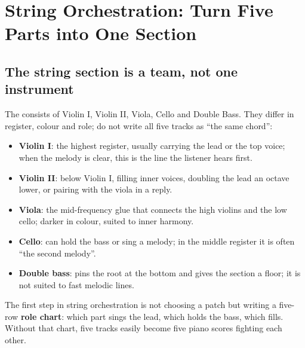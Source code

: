 \chapter{String Orchestration: Turn Five Parts into One Section}
\label{ch:strings}


\section{The string section is a team, not one instrument}
\label{sec:string-section}

The  consists of Violin I, Violin II, Viola, Cello and Double Bass. They differ in register, colour and role; do not write all five tracks as ``the same chord'':

\begin{itemize}
\item \textbf{Violin I}: the highest register, usually carrying the lead or the top voice; when the melody is clear, this is the line the listener hears first.
\item \textbf{Violin II}: below Violin I, filling inner voices, doubling the lead an octave lower, or pairing with the viola in a reply.
\item \textbf{Viola}: the mid-frequency glue that connects the high violins and the low cello; darker in colour, suited to inner harmony.
\item \textbf{Cello}: can hold the bass or sing a melody; in the middle register it is often ``the second melody''.
\item \textbf{Double bass}: pins the root at the bottom and gives the section a floor; it is not suited to fast melodic lines.
\end{itemize}

The first step in string orchestration is not choosing a patch but writing a five-row \textbf{role chart}: which part sings the lead, which holds the bass, which fills. Without that chart, five tracks easily become five piano scores fighting each other.

